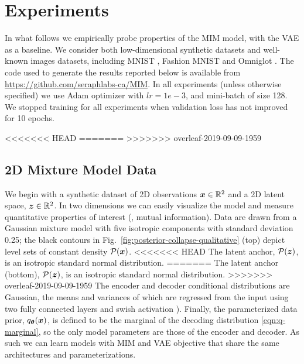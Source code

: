 \section{Experiments} \label{sec:experiments}

In what follows we empirically probe properties of the MIM model,
with the VAE as a baseline.  We consider both low-dimensional synthetic 
datasets and well-known images datasets, including MNIST \cite{LeCun1998}, 
Fashion MNIST \cite{DBLP:journals/corr/abs-1708-07747} and Omniglot \cite{Lake2015}. 
The code used to generate the results reported below is available 
from \href{https://github.com/seraphlabs-ca/MIM}{https://github.com/seraphlabs-ca/MIM}.
In all experiments (unless otherwise specified) we use Adam optimizer \cite{2014arXiv1412.6980K} with $lr = 1e-3$, and
mini-batch of size 128. We stopped training for all experiments when validation loss
has not improved for 10 epochs.

<<<<<<< HEAD
=======
>>>>>>> overleaf-2019-09-09-1959
\subsection{2D Mixture Model Data} 
\label{sec:posterior-collapse-mim-vae}


We begin with a synthetic dataset of 2D observations ${\boldsymbol{x}} \in \mathbb{R}^2$
and a 2D latent space, ${\boldsymbol z} \in \mathbb{R}^2$. In two dimensions we can easily 
visualize the model and measure quantitative properties of interest (\eg, mutual information).
Data are drawn from a Gaussian mixture model with five isotropic components
with standard deviation 0.25; the black contours in Fig.\ \ref{fig:posterior-collapse-qualitative} (top) depict level sets of constant density $\mathcal{P}({\boldsymbol{x}})$. 
<<<<<<< HEAD
The latent anchor, $\mathcal{P}({\boldsymbol z})$, is an isotropic standard normal distribution.
=======
The latent anchor (bottom), $\mathcal{P}({\boldsymbol z})$, is an isotropic standard normal distribution.
>>>>>>> overleaf-2019-09-09-1959
The encoder and decoder conditional distributions are Gaussian, the means
and variances of which are regressed from the input using two fully 
connected layers and swish activation \cite{Ramachandran2017}).
Finally, the parameterized data prior, $q_{{\boldsymbol \theta}}({\boldsymbol{x}})$, is defined to be the 
marginal of the decoding distribution \eqref{eqn:q-marginal}, so
the only model parameters are those of the encoder and decoder.
As such we can learn models with MIM and VAE objective that share
the same architectures and parameterizations.

